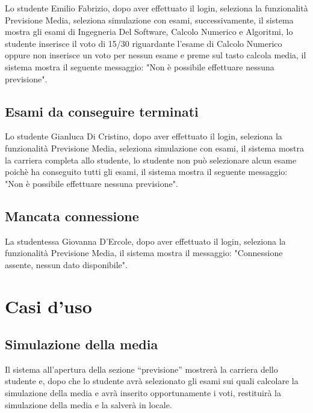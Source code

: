 Lo studente Emilio Fabrizio, dopo aver effettuato il login, seleziona la funzionalità Previsione Media, seleziona simulazione con esami, successivamente, il sistema mostra gli esami di Ingegneria Del Software, Calcolo Numerico e Algoritmi, lo studente inserisce il voto di 15/30 riguardante l'esame di Calcolo Numerico oppure non inserisce un voto per nessun esame e preme sul tasto calcola media, il sistema mostra il seguente messaggio: "Non è possibile effettuare nessuna previsione".

\subsection{Esami da conseguire terminati}

Lo studente Gianluca Di Cristino, dopo aver effettuato il login, seleziona la funzionalità Previsione Media, seleziona simulazione con esami, il sistema mostra la carriera completa allo studente, lo studente non può selezionare alcun esame poichè ha conseguito tutti gli esami, il sistema mostra il seguente messaggio: "Non è possibile effettuare nessuna previsione". 

\subsection{Mancata connessione}

La studentessa Giovanna D'Ercole, dopo aver effettuato il login, seleziona la funzionalità Previsione Media, il sistema mostra il messaggio: "Connessione assente, nessun dato disponibile".

\section{Casi d'uso}

\subsection{Simulazione della media} 
Il sistema all’apertura della sezione “previsione” mostrerà la carriera dello studente e, dopo che lo studente avrà selezionato gli esami sui quali calcolare la simulazione della media e avrà inserito opportunamente i voti, restituirà la simulazione della media e la salverà in locale.

